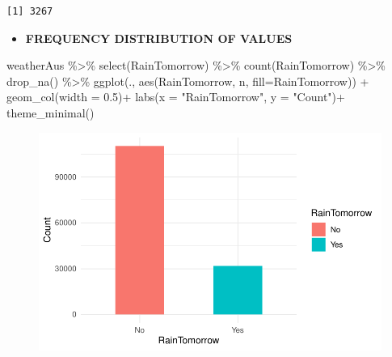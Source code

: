 \documentclass[
  letterpaper,
  DIV=11,
  numbers=noendperiod]{scrartcl}
\newenvironment{Shaded}{\begin{snugshade}}{\end{snugshade}}
\newcommand{\AttributeTok}[1]{\textcolor[rgb]{0.40,0.45,0.13}{#1}}
\newcommand{\FloatTok}[1]{\textcolor[rgb]{0.68,0.00,0.00}{#1}}
\newcommand{\FunctionTok}[1]{\textcolor[rgb]{0.28,0.35,0.67}{#1}}
\newcommand{\NormalTok}[1]{\textcolor[rgb]{0.00,0.23,0.31}{#1}}
\newcommand{\OtherTok}[1]{\textcolor[rgb]{0.00,0.23,0.31}{#1}}
\newcommand{\SpecialCharTok}[1]{\textcolor[rgb]{0.37,0.37,0.37}{#1}}
\newcommand{\StringTok}[1]{\textcolor[rgb]{0.13,0.47,0.30}{#1}}
\providecommand{\tightlist}{%
  \setlength{\itemsep}{0pt}\setlength{\parskip}{0pt}}\usepackage{longtable,booktabs,array}
\begin{document}
\begin{Shaded}
\end{Shaded}

\begin{verbatim}
[1] 3267
\end{verbatim}

\begin{itemize}
\tightlist
\item
  \textbf{FREQUENCY DISTRIBUTION OF VALUES}
\end{itemize}

\begin{Shaded}
\begin{Highlighting}[]
\NormalTok{  weatherAus }\SpecialCharTok{\%\textgreater{}\%} \FunctionTok{select}\NormalTok{(RainTomorrow) }\SpecialCharTok{\%\textgreater{}\%}
  \FunctionTok{count}\NormalTok{(RainTomorrow) }\SpecialCharTok{\%\textgreater{}\%} \FunctionTok{drop\_na}\NormalTok{() }\SpecialCharTok{\%\textgreater{}\%}
  \FunctionTok{ggplot}\NormalTok{(., }\FunctionTok{aes}\NormalTok{(RainTomorrow, n, }\AttributeTok{fill=}\NormalTok{RainTomorrow)) }\SpecialCharTok{+}
  \FunctionTok{geom\_col}\NormalTok{(}\AttributeTok{width =} \FloatTok{0.5}\NormalTok{)}\SpecialCharTok{+}
  \FunctionTok{labs}\NormalTok{(}\AttributeTok{x =} \StringTok{"RainTomorrow"}\NormalTok{, }\AttributeTok{y =} \StringTok{"Count"}\NormalTok{)}\SpecialCharTok{+}
  \FunctionTok{theme\_minimal}\NormalTok{()}
\end{Highlighting}
\end{Shaded}

\begin{figure}[H]

{\centering \includegraphics{RainAus_EDA_files/figure-pdf/unnamed-chunk-6-1.pdf}

}

\end{figure}
\end{document}
